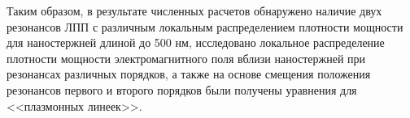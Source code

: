 Таким образом, в результате численных расчетов  обнаружено наличие двух резонансов ЛПП  с различным локальным распределением плотности мощности для наностержней длиной до 500 нм, исследовано локальное распределение плотности мощности электромагнитного поля вблизи наностержней при резонансах различных порядков, а также на основе смещения положения резонансов первого и второго порядков были получены уравнения для <<плазмонных линеек>>.

